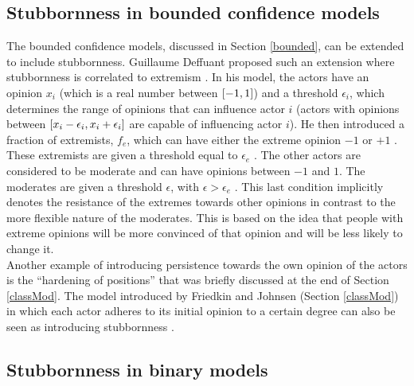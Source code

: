 \documentclass[11 pt , letterpaper , twoside , openright]{book}
\begin{document}
\subsection{Stubbornness in bounded confidence models}

The bounded confidence models, discussed in Section \ref{bounded}, can be extended to include stubbornness. Guillaume Deffuant proposed such an extension where stubbornness is correlated to extremism \cite{Deffuant2006}. In his model, the actors have an opinion $x_i$ (which is a real number between $\interval{-1}{1}$) and a threshold $\epsilon_i$, which determines the range of opinions that can influence actor $i$ (actors with opinions between $\interval{x_i - \epsilon_i}{x_i + \epsilon_i}$ are capable of influencing actor $i$). He then introduced a fraction of extremists, $f_e$, which can have either the extreme opinion $-1$ or $+1$ \cite{Deffuant2006}. These extremists are given a threshold equal to $\epsilon_e$ \cite{Deffuant2006}. The other actors are considered to be moderate and can have opinions between $-1$ and $1$. The moderates are given a threshold $\epsilon$, with $\epsilon > \epsilon_e$ \cite{Deffuant2006}. This last condition implicitly denotes the resistance of the extremes towards other opinions in contrast to the more flexible nature of the moderates. This is based on the idea that people with extreme opinions will be more convinced of that opinion and will be less likely to change it.\\
\newline
Another example of introducing persistence towards the own opinion of the actors is the ``hardening of positions'' that was briefly discussed at the end of Section \ref{classMod}. The model introduced by Friedkin and Johnsen (Section \ref{classMod}) in which each actor adheres to its initial opinion to a certain degree can also be seen as introducing stubbornness \cite{Noorazar2020}.

\subsection{Stubbornness in binary models}
\label{stubbBin}
\end{document}
